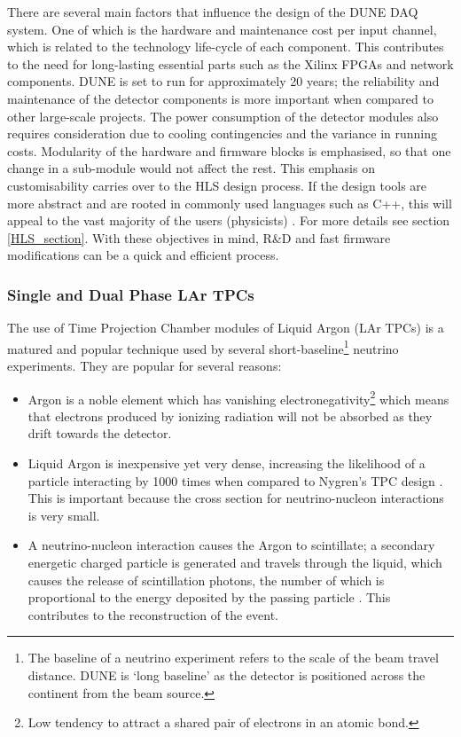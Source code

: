 \documentclass[10pt]{article}
\begin{document}
There are several main factors that influence the design of the DUNE DAQ system. One of which is the hardware and maintenance cost per input channel, which is related to the technology life-cycle of each component. This contributes to the need for long-lasting essential parts such as the Xilinx FPGAs and network components. DUNE is set to run for approximately 20 years; the reliability and maintenance of the detector components is more important when compared to other large-scale projects. The power consumption of the detector modules also requires consideration due to cooling contingencies and the variance in running costs.  Modularity of the hardware and firmware blocks is emphasised, so that one change in a sub-module would not affect the rest. This emphasis on customisability carries over to the HLS design process. If the design tools are more abstract and are rooted in commonly used languages such as C++, this will appeal to the vast majority of the users (physicists) \cite{abi_barr_martin-albo_azfar_2017}. For more details see section \ref{HLS_section}. With these objectives in mind, R\&D and fast firmware modifications can be a quick and efficient process. 

\subsubsection{Single and Dual Phase LAr TPCs}

The use of Time Projection Chamber modules of Liquid Argon (LAr TPCs) is a matured and popular technique used by several short-baseline\footnote{The baseline of a neutrino experiment refers to the scale of the beam travel distance. DUNE is `long baseline' as the detector is positioned across the continent from the beam source.} neutrino experiments. They are popular for several reasons:

\begin{itemize}
	\item Argon is a noble element which has vanishing electronegativity\footnote{Low tendency to attract a shared pair of electrons in an atomic bond.} which means that electrons produced by ionizing radiation will not be absorbed as they drift towards the detector.
	\item  Liquid Argon is inexpensive yet very dense, increasing the likelihood of a particle interacting by 1000 times when compared to Nygren's TPC design \cite{rubbia1977liquid}. This is important because the cross section for neutrino-nucleon interactions is very small.
	\item A neutrino-nucleon interaction causes the Argon to scintillate; a secondary energetic charged particle is generated and travels through the liquid, which causes the release of scintillation photons, the number of which is proportional to the energy deposited by the passing particle \cite{adams2018rejecting}. This contributes to the reconstruction of the event. 
	
\end{itemize}
\end{document}
